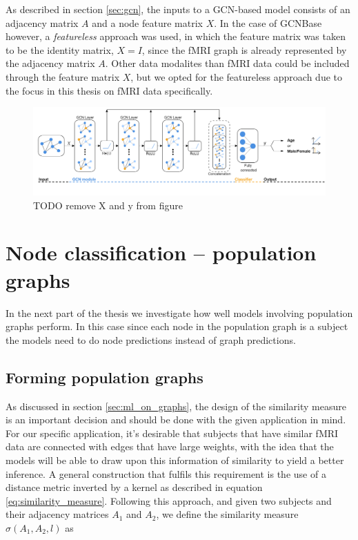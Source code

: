 As described in section \ref{sec:gcn}, the inputs to a GCN-based model consists of an adjacency matrix $A$ and a node feature matrix $X$. In the case of GCNBase however, a \textit{featureless} approach was used, in which the feature matrix was taken to be the identity matrix, $X=I$, since the fMRI graph is already represented by the adjacency matrix $A$. Other data modalites than fMRI data could be included through the feature matrix $X$, but we opted for the featureless approach due to the focus in this thesis on fMRI data specifically.

%         

\begin{figure}[H]
    \centering
    \includegraphics[width=\textwidth]{chapters/images_methods/base_v2.png}
    \caption{TODO remove X and y from figure}
    \label{fig:gcn_base}
\end{figure}


\section{Node classification -- population graphs}
In the next part of the thesis we investigate how well models involving population graphs perform. In this case since each node in the population graph is a subject the models need to do node predictions instead of graph predictions. 

\subsection{Forming population graphs}

As discussed in section \ref{sec:ml_on_graphs}, the design of the similarity measure is an important decision and should be done with the given application in mind. For our specific application, it's desirable that subjects that have similar fMRI data are connected with edges that have large weights, with the idea that the models will be able to draw upon this information of similarity to yield a better inference. A general construction that fulfils this requirement is the use of a distance metric inverted by a kernel as described in equation \eqref{eq:similarity_measure}. Following this approach, and given two subjects and their adjacency matrices $A_1$ and $A_2$, we define the similarity measure $\sigma\left(A_1, A_2, l\right)$ as

